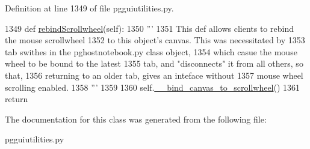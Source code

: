 Definition at line 1349 of file pgguiutilities.\+py.


\begin{DoxyCode}
1349     \textcolor{keyword}{def }\hyperlink{classnegui_1_1pgguiutilities_1_1FrameContainerScrolled_afcc54f75cc509614a3d265d6578cc147}{rebindScrollwheel}(self):
1350         \textcolor{stringliteral}{'''}
1351 \textcolor{stringliteral}{        This def allows clients to rebind the mouse scrollwheel}
1352 \textcolor{stringliteral}{        to this object's canvas.  This was necessitated by}
1353 \textcolor{stringliteral}{        tab swithes in the pghostnotebook.py class object,}
1354 \textcolor{stringliteral}{        which casue the mouse wheel to be bound to the latest}
1355 \textcolor{stringliteral}{        tab, and "disconnects" it from all others, so that,}
1356 \textcolor{stringliteral}{        returning to an older tab, gives an inteface without}
1357 \textcolor{stringliteral}{        mouse wheel scrolling enabled.}
1358 \textcolor{stringliteral}{        '''}
1359 
1360         self.\hyperlink{classnegui_1_1pgguiutilities_1_1FrameContainerScrolled_a4d43cdbefdf2cb397141a0a74a87c629}{\_\_bind\_canvas\_to\_scrollwheel}()
1361         \textcolor{keywordflow}{return}
\end{DoxyCode}


The documentation for this class was generated from the following file\+:\begin{DoxyCompactItemize}
\item 
pgguiutilities.\+py\end{DoxyCompactItemize}
